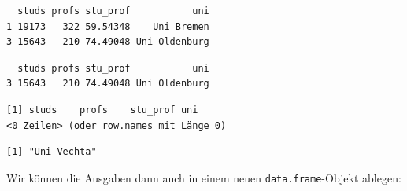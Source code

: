 \documentclass[
  letterpaper,
  DIV=11,
  numbers=noendperiod]{scrreprt}
\newenvironment{Shaded}{\begin{snugshade}}{\end{snugshade}}
\newcommand{\DecValTok}[1]{\textcolor[rgb]{0.68,0.00,0.00}{#1}}
\newcommand{\DocumentationTok}[1]{\textcolor[rgb]{0.37,0.37,0.37}{\textit{#1}}}
\newcommand{\NormalTok}[1]{\textcolor[rgb]{0.00,0.46,0.62}{#1}}
\newcommand{\SpecialCharTok}[1]{\textcolor[rgb]{0.37,0.37,0.37}{#1}}
\newcommand{\StringTok}[1]{\textcolor[rgb]{0.13,0.47,0.30}{#1}}
\begin{document}
\begin{verbatim}
  studs profs stu_prof           uni
1 19173   322 59.54348    Uni Bremen
3 15643   210 74.49048 Uni Oldenburg
\end{verbatim}

\begin{Shaded}
\end{Shaded}

\begin{verbatim}
  studs profs stu_prof           uni
3 15643   210 74.49048 Uni Oldenburg
\end{verbatim}

\begin{Shaded}
\end{Shaded}

\begin{verbatim}
[1] studs    profs    stu_prof uni     
<0 Zeilen> (oder row.names mit Länge 0)
\end{verbatim}

\begin{Shaded}
\end{Shaded}

\begin{verbatim}
[1] "Uni Vechta"
\end{verbatim}

Wir können die Ausgaben dann auch in einem neuen
\texttt{data.frame}-Objekt ablegen:
\end{document}
